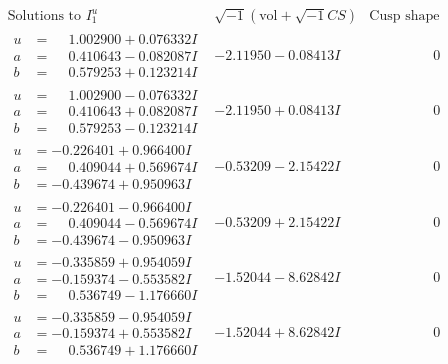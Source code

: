 \documentclass[1p]{elsarticle_modified}
\theoremstyle{definition}
\newcommand{\I}{\sqrt{-1}}
\begin{document}
$$\begin{array}{c|c|c}  
\text{Solutions to }I^u_{1}& \I (\text{vol} + \sqrt{-1}CS) & \text{Cusp shape}\\
 \hline 
\begin{aligned}
u &= \phantom{-}1.002900 + 0.076332 I \\
a &= \phantom{-}0.410643 - 0.082087 I \\
b &= \phantom{-}0.579253 + 0.123214 I\end{aligned}
 & -2.11950 - 0.08413 I & \phantom{-0.000000 } 0 \\ \hline\begin{aligned}
u &= \phantom{-}1.002900 - 0.076332 I \\
a &= \phantom{-}0.410643 + 0.082087 I \\
b &= \phantom{-}0.579253 - 0.123214 I\end{aligned}
 & -2.11950 + 0.08413 I & \phantom{-0.000000 } 0 \\ \hline\begin{aligned}
u &= -0.226401 + 0.966400 I \\
a &= \phantom{-}0.409044 + 0.569674 I \\
b &= -0.439674 + 0.950963 I\end{aligned}
 & -0.53209 - 2.15422 I & \phantom{-0.000000 } 0 \\ \hline\begin{aligned}
u &= -0.226401 - 0.966400 I \\
a &= \phantom{-}0.409044 - 0.569674 I \\
b &= -0.439674 - 0.950963 I\end{aligned}
 & -0.53209 + 2.15422 I & \phantom{-0.000000 } 0 \\ \hline\begin{aligned}
u &= -0.335859 + 0.954059 I \\
a &= -0.159374 - 0.553582 I \\
b &= \phantom{-}0.536749 - 1.176660 I\end{aligned}
 & -1.52044 - 8.62842 I & \phantom{-0.000000 } 0 \\ \hline\begin{aligned}
u &= -0.335859 - 0.954059 I \\
a &= -0.159374 + 0.553582 I \\
b &= \phantom{-}0.536749 + 1.176660 I\end{aligned}
 & -1.52044 + 8.62842 I & \phantom{-0.000000 } 0 \\ \hline\begin{aligned}

\end{aligned}
\end{array}$$
\end{document}
